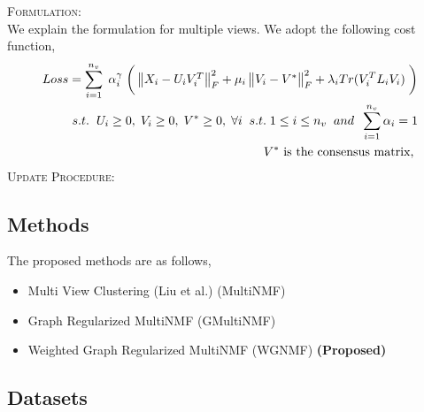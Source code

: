 \documentclass[a4paper]{article}
\begin{document}
	\textsc{Formulation:}\\
	We explain the formulation for multiple views. We adopt the following cost function,
	\begin{align*}
	Loss = \displaystyle\sum_{i=1}^{n_{v}} \; \alpha_{i}^{\gamma} \; 
		\bigg(\begin{Vmatrix} X_{i}-U_{i}V^{T}_{i} \end{Vmatrix}^{2}_{F}	
		+ \mu_{i}\begin{Vmatrix} V_{i}-V^{*} \end{Vmatrix}^{2}_{F}
		+ \lambda_{i}Tr(V^{T}_{i}L_{i}V_{i}) \; \bigg)\\	
		s.t. \hspace{2mm}  U_{i}\geq0,\;V_{i}\geq0,\;V^{*}\geq0,\;\forall i \;\;s.t.\; 1 \leq i \leq n_{v}
		\;\; and \;\; \sum_{i=1}^{n_{v}} \alpha_{i} = 1 \\
		V^{*} \text{ is the consensus matrix, }
	\end{align*}
	\textsc{Update Procedure:}


	\subsection{Methods}
	
	The proposed methods are as follows,
	\begin{itemize}
	\item {Multi View Clustering (Liu et al.) (MultiNMF)}
	\item {Graph Regularized MultiNMF (GMultiNMF)}
	\item {Weighted Graph Regularized MultiNMF (WGNMF)	\small\textbf{(Proposed)}}
	\end{itemize}

	\subsection{Datasets}
	
\end{document}
